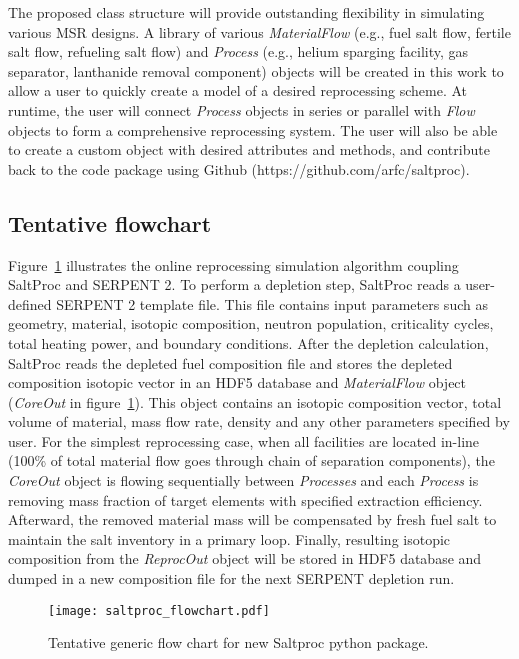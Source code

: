 The proposed class structure will provide outstanding flexibility in simulating 
various \gls{MSR} designs. A library of various \textit{MaterialFlow} (e.g., 
fuel salt flow, fertile salt flow, refueling salt flow) and \textit{Process} 
(e.g., helium sparging facility, gas separator, lanthanide removal component) 
objects will be created in this work to allow a user to quickly create a model 
of a desired reprocessing scheme. At runtime, the user will connect 
\textit{Process} objects in series or parallel with \textit{Flow} objects to 
form a comprehensive reprocessing system. The user will also be able to create 
a custom object with desired attributes and methods, and contribute back 
to the code package using Github (https://github.com/arfc/saltproc).	

\subsection{Tentative flowchart}
Figure~\ref{fig:saltproc_flow} illustrates the online reprocessing simulation 
algorithm coupling SaltProc and SERPENT 2. To perform a depletion step, 
SaltProc reads a user-defined SERPENT 2 template file. This file contains input 
 parameters such as geometry, material, isotopic composition, neutron 
population, criticality cycles, total heating power, and boundary conditions.  
After the depletion calculation, SaltProc reads the depleted fuel composition 
file and stores the depleted composition isotopic vector in an HDF5 database 
and \textit{MaterialFlow} object (\textit{CoreOut} in 
figure~\ref{fig:saltproc_flow}). This object contains an isotopic composition 
vector, total volume of material, mass flow rate, density and any other 
parameters specified by user. For the simplest reprocessing case, when all 
facilities are located in-line (100\% of total material flow goes through 
chain of separation components), the \textit{CoreOut} object is flowing 
sequentially between \textit{Processes} and each \textit{Process} is 
removing mass fraction of target elements with specified extraction 
efficiency. Afterward, the removed material mass will be compensated by 
fresh fuel salt to maintain the salt inventory in a primary loop. 
Finally, resulting isotopic composition from the \textit{ReprocOut} object will 
be stored in HDF5 database and dumped in a new composition file for the next 
SERPENT depletion run. 
\begin{figure}[ht!] %
  \texttt{[image: saltproc\_flowchart.pdf]}
  \caption{Tentative generic flow chart for new Saltproc python package.}
  \label{fig:saltproc_flow}
\end{figure}

